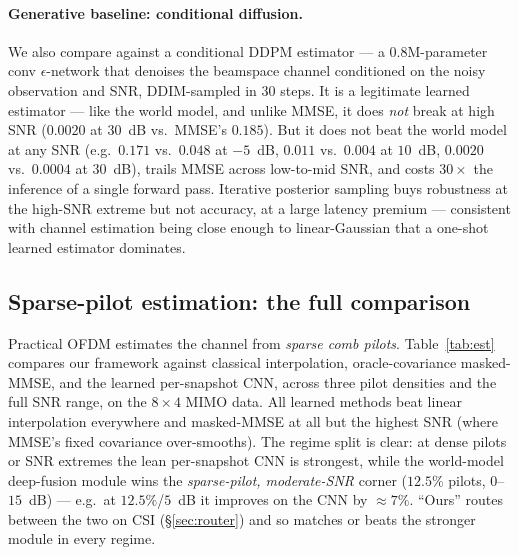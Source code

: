 \documentclass[11pt]{article}
\begin{document}
\paragraph{Generative baseline: conditional diffusion.} We also compare against a conditional DDPM
estimator --- a $0.8$M-parameter conv $\epsilon$-network that denoises the beamspace channel
conditioned on the noisy observation and SNR, DDIM-sampled in $30$ steps. It is a legitimate learned
estimator --- like the world model, and unlike MMSE, it does \emph{not} break at high SNR ($0.0020$ at
$30$~dB vs.\ MMSE's $0.185$). But it does not beat the world model at any SNR (e.g.\ $0.171$ vs.\
$0.048$ at $-5$~dB, $0.011$ vs.\ $0.004$ at $10$~dB, $0.0020$ vs.\ $0.0004$ at $30$~dB), trails MMSE
across low-to-mid SNR, and costs $30\times$ the inference of a single forward pass. Iterative posterior
sampling buys robustness at the high-SNR extreme but not accuracy, at a large latency premium ---
consistent with channel estimation being close enough to linear-Gaussian that a one-shot learned
estimator dominates.

\subsection{Sparse-pilot estimation: the full comparison}\label{sec:sparse}
Practical OFDM estimates the channel from \emph{sparse comb pilots}. Table~\ref{tab:est} compares our
framework against classical interpolation, oracle-covariance masked-MMSE, and the learned per-snapshot
CNN, across three pilot densities and the full SNR range, on the $8\times4$ MIMO data. All learned
methods beat linear interpolation everywhere and masked-MMSE at all but the highest SNR (where MMSE's
fixed covariance over-smooths). The regime split is clear: at dense pilots or SNR extremes the lean
per-snapshot CNN is strongest, while the world-model deep-fusion module wins the \emph{sparse-pilot,
moderate-SNR} corner ($12.5\%$ pilots, $0$--$15$~dB) --- e.g.\ at $12.5\%$/$5$~dB it improves on the
CNN by ${\approx}7\%$. ``Ours'' routes between the two on CSI (\S\ref{sec:router}) and so matches or
beats the stronger module in every regime.
\end{document}
